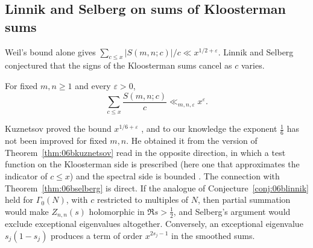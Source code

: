 \subsection{Linnik and Selberg on sums of Kloosterman sums}

Weil's bound alone gives $\sum_{c\le x}|S(m,n;c)|/c\ll x^{1/2+\varepsilon}$. Linnik \cite{linnik1962} and Selberg \cite{selberg1965} conjectured that the signs of the Kloosterman sums cancel as $c$ varies.

\begin{conjecture}\label{conj:06blinnik}
For fixed $m,n\ge1$ and every $\varepsilon>0$,
\[
\sum_{c\le x}\frac{S(m,n;c)}{c}\ll_{m,n,\varepsilon}x^{\varepsilon}.
\]
\end{conjecture}

Kuznetsov proved the bound $x^{1/6+\varepsilon}$ \cite{kuznetsov1980}, and to our knowledge the exponent $\frac16$ has not been improved for fixed $m,n$. He obtained it from the version of Theorem~\ref{thm:06bkuznetsov} read in the opposite direction, in which a test function on the Kloosterman side is prescribed (here one that approximates the indicator of $c\le x$) and the spectral side is bounded \cite{iwanieckowalski2004}. The connection with Theorem~\ref{thm:06bselberg} is direct. If the analogue of Conjecture~\ref{conj:06blinnik} held for $\Gamma_0(N)$, with $c$ restricted to multiples of $N$, then partial summation would make $Z_{n,n}(s)$ holomorphic in $\Re s>\frac12$, and Selberg's argument would exclude exceptional eigenvalues altogether. Conversely, an exceptional eigenvalue $s_j(1-s_j)$ produces a term of order $x^{2s_j-1}$ in the smoothed sums.

